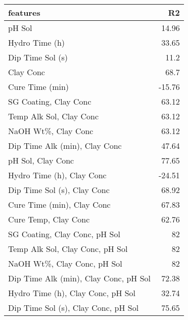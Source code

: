 
    \begin{table*}[h]
        \centering
        \begin{tabular}{lr}
\hline
 features                                                            &     R2 \\
\hline
 pH Sol                                                              &  14.96 \\
 Hydro Time (h)                                                      &  33.65 \\
 Dip Time Sol (s)                                                    &  11.2  \\
 Clay Conc                                                           &  68.7  \\
 Cure Time (min)                                                     & -15.76 \\
 SG Coating, Clay Conc                                               &  63.12 \\
 Temp Alk Sol, Clay Conc                                             &  63.12 \\
 NaOH Wt\%, Clay Conc                                                &  63.12 \\
 Dip Time Alk (min), Clay Conc                                       &  47.64 \\
 pH Sol, Clay Conc                                                   &  77.65 \\
 Hydro Time (h), Clay Conc                                           & -24.51 \\
 Dip Time Sol (s), Clay Conc                                         &  68.92 \\
 Cure Time (min), Clay Conc                                          &  67.83 \\
 Cure Temp, Clay Conc                                                &  62.76 \\
 SG Coating, Clay Conc, pH Sol                                       &  82    \\
 Temp Alk Sol, Clay Conc, pH Sol                                     &  82    \\
 NaOH Wt\%, Clay Conc, pH Sol                                        &  82    \\
 Dip Time Alk (min), Clay Conc, pH Sol                               &  72.38 \\
 Hydro Time (h), Clay Conc, pH Sol                                   &  32.74 \\
 Dip Time Sol (s), Clay Conc, pH Sol                                 &  75.65 \\

\end{tabular}
\end{table*}
